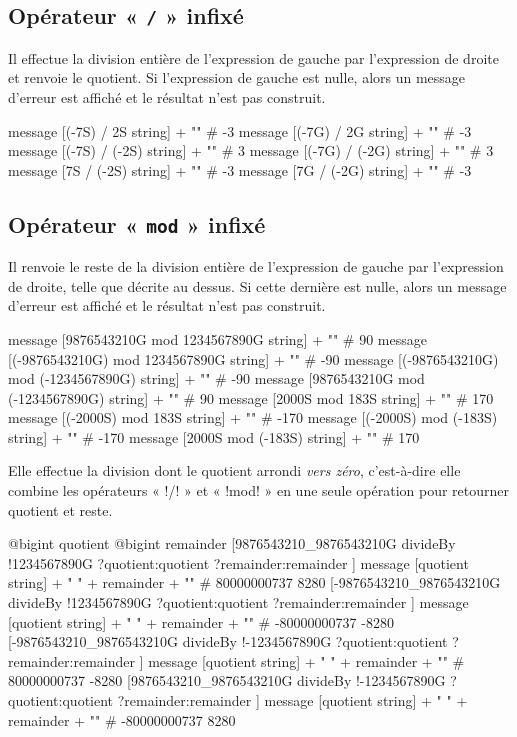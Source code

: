 \subsection{Opérateur « \texttt{/} » infixé}
Il effectue la division entière de l'expression de gauche par l'expression de droite et renvoie le quotient. Si l'expression de gauche est nulle, alors un message d'erreur est affiché et le résultat n'est pas construit.

\begin{galgas}
  message [(-7S) / 2S string] + "\n" # -3
  message [(-7G) / 2G string] + "\n" # -3
  message [(-7S) / (-2S) string] + "\n" # 3
  message [(-7G) / (-2G) string] + "\n" # 3
  message [7S / (-2S) string] + "\n" # -3
  message [7G / (-2G) string] + "\n" # -3
\end{galgas}



\subsection{Opérateur « \texttt{mod} » infixé}
Il renvoie le reste de la division entière de l'expression de gauche par l'expression de droite, telle que décrite au dessus. Si cette dernière est nulle, alors un message d'erreur est affiché et le résultat n'est pas construit.

\begin{galgas}
  message [9876543210G mod 1234567890G string] + "\n" # 90
  message [(-9876543210G) mod 1234567890G string] + "\n" # -90
  message [(-9876543210G) mod (-1234567890G) string] + "\n"  # -90
  message [9876543210G mod (-1234567890G) string] + "\n"  # 90
  message [2000S mod 183S string] + "\n" # 170
  message [(-2000S) mod 183S string] + "\n" # -170
  message [(-2000S) mod (-183S) string] + "\n" # -170
  message [2000S mod (-183S) string] + "\n" # 170
\end{galgas}




Elle effectue la division dont le quotient arrondi \emph{vers zéro}, c'est-à-dire elle combine les opérateurs « \ggs!/! » et « \ggs!mod! » en une seule opération pour retourner quotient et reste.

\begin{galgas}
  @bigint quotient
  @bigint remainder
  [9876543210_9876543210G divideBy
    !1234567890G
    ?quotient:quotient
    ?remainder:remainder
  ]
  message [quotient string] + " " + remainder + "\n" # 80000000737 8280
  [-9876543210_9876543210G divideBy
    !1234567890G
    ?quotient:quotient
    ?remainder:remainder
  ]
  message [quotient string] + " " + remainder + "\n" # -80000000737 -8280
  [-9876543210_9876543210G divideBy
    !-1234567890G
    ?quotient:quotient
    ?remainder:remainder
  ]
  message [quotient string] + " " + remainder + "\n" # 80000000737 -8280
  [9876543210_9876543210G divideBy
    !-1234567890G
    ?quotient:quotient
    ?remainder:remainder
  ]
  message [quotient string] + " " + remainder + "\n" # -80000000737 8280
\end{galgas}




